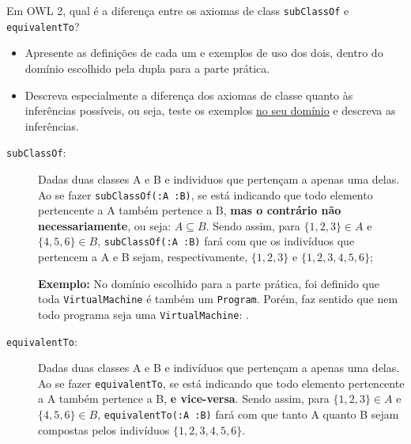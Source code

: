 \documentclass[answers]{exam}
\newcommand{\todo}[1]{{\color{red}{#1}}}
\begin{document}
    \begin{questions}
        \question{}
        Em OWL 2, qual é a diferença entre os axiomas de class
        \texttt{subClassOf} e \texttt{equivalentTo}?
        \begin{itemize}
            \item Apresente as definições de cada um e exemplos de uso dos
                dois, dentro do domínio escolhido pela dupla para a parte
                prática.
            \item Descreva especialmente a diferença dos axiomas de classe
                quanto às inferências possíveis, ou seja, teste os exemplos
                \underline{no seu domínio} e descreva as inferências.
        \end{itemize}

        \begin{answer}
            \begin{description}
                \item [\texttt{subClassOf}:] Dadas duas classes A e B e
                    individuos que pertençam a apenas uma delas. Ao se fazer
                    \texttt{subClassOf(:A :B)}, se está indicando que todo
                    elemento pertencente a A também pertence a B, \textbf{mas o
                    contrário não necessariamente}, ou seja: $A \subseteq B$.
                    Sendo assim, para $\{1, 2, 3\} \in A$ e $\{4, 5, 6\} \in
                    B$, \texttt{subClassOf(:A :B)} fará com que os indivíduos
                    que pertencem a A e B sejam, respectivamente, $\{1, 2, 3\}$
                    e $\{1, 2, 3, 4, 5, 6\}$;

                    \textbf{Exemplo:} No domínio escolhido para a parte
                    prática, foi definido que toda \texttt{VirtualMachine} é
                    também um \texttt{Program}. Porém, faz sentido que nem todo
                    programa seja uma \texttt{VirtualMachine}: \todo{YAY}.

                \item [\texttt{equivalentTo}:] Dadas duas classes A e B e
                    indivíduos que pertençam a apenas uma delas. Ao se fazer
                    \texttt{equivalentTo}, se está indicando que todo elemento
                    pertencente a A também pertence a B, \textbf{e vice-versa}.
                    Sendo assim, para $\{1, 2, 3\} \in A$ e $\{4, 5, 6\} \in
                    B$, \texttt{equivalentTo(:A :B)} fará com que tanto A
                    quanto B sejam compostas pelos indivíduos $\{1, 2, 3, 4,
                    5, 6\}$.
            \end{description}


\end{answer}
\end{questions}
\end{document}
